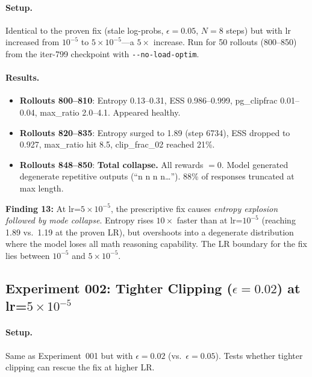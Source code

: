 \documentclass[11pt,a4paper]{article}
\begin{document}
\paragraph{Setup.} Identical to the proven fix (stale log-probs, $\epsilon = 0.05$,
$N = 8$ steps) but with lr increased from $10^{-5}$ to $5 \times 10^{-5}$---a
$5\times$ increase. Run for 50 rollouts (800--850) from the iter-799 checkpoint
with \texttt{-{}-no-load-optim}.

\paragraph{Results.}
\begin{itemize}[leftmargin=*]
  \item \textbf{Rollouts 800--810}: Entropy 0.13--0.31, ESS 0.986--0.999,
    pg\_clipfrac 0.01--0.04, max\_ratio 2.0--4.1. Appeared healthy.
  \item \textbf{Rollouts 820--835}: Entropy surged to 1.89 (step 6734), ESS
    dropped to 0.927, max\_ratio hit 8.5, clip\_frac\_02 reached 21\%.
  \item \textbf{Rollouts 848--850}: \textbf{Total collapse.} All rewards $= 0$.
    Model generated degenerate repetitive outputs (``n n n n\ldots'').
    88\% of responses truncated at max length.
\end{itemize}

\begin{keyinsight}
\textbf{Finding 13:} At lr=$5 \times 10^{-5}$, the prescriptive fix causes
\emph{entropy explosion followed by mode collapse}. Entropy rises $10\times$
faster than at lr=$10^{-5}$ (reaching 1.89 vs.\ 1.19 at the proven LR), but
overshoots into a degenerate distribution where the model loses all math
reasoning capability. The LR boundary for the fix lies between $10^{-5}$ and
$5 \times 10^{-5}$.
\end{keyinsight}

\subsection{Experiment 002: Tighter Clipping ($\epsilon = 0.02$) at lr=$5 \times 10^{-5}$}

\paragraph{Setup.} Same as Experiment~001 but with $\epsilon = 0.02$
(vs.\ $\epsilon = 0.05$). Tests whether tighter clipping can rescue the fix at
higher LR.
\end{document}
